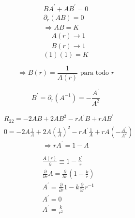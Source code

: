 \begin{equation}
    \begin{gathered}
        B A^{\prime}+A B^{\prime}=0 \\
        \partial_r(A B)=0 \\
        \Rightarrow A B=K
    \end{gathered}
\end{equation}
\begin{equation}
    \begin{aligned}
         & A(r) \rightarrow 1 \\
         & B(r) \rightarrow 1
    \end{aligned}
\end{equation}
\begin{equation}
    (1)(1)=K
\end{equation}

\begin{equation}
    \Rightarrow B(r)=\frac{1}{A(r)} \text { para todo } r
\end{equation}

\begin{equation}
    B^{\prime}=\partial_r\left(A^{-1}\right)=-\frac{A^{\prime}}{A^2}
\end{equation}


\begin{equation}
    \begin{aligned}
         & R_{22}=-2 A B+2 A B^2-r A^{\prime} B+r A B^{\prime}                                                                  \\
         & 0=-2 A \frac{1}{A}+2 A\left(\frac{1}{A}\right)^2-r A^{\prime} \frac{1}{A}+r A\left(-\frac{A^{\prime}}{A^2}\right)
    \end{aligned}
\end{equation}
\begin{equation}
    \Rightarrow r A^{\prime}=1-A
\end{equation}

\begin{equation}
    \begin{aligned}
         & \frac{A(r)}{\partial} \equiv 1-\frac{k^{\prime}}{r}                                 \\
         & \frac{\partial}{\partial r} A=\frac{\partial}{\partial r}\left(1-\frac{k}{r}\right) \\
         & A^{\prime}=\frac{\partial}{\partial r} 1-k \frac{\partial}{\partial r} r^{-1}       \\
         & A^{\prime}=0                                                                        \\
         & A^{\prime}=\frac{k}{r^2}
    \end{aligned}
\end{equation}

